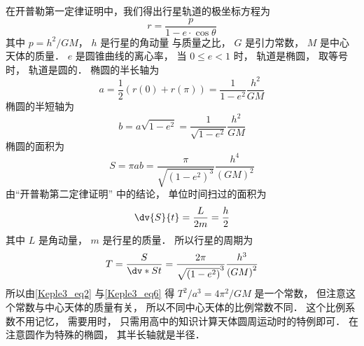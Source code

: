 

在开普勒第一定律证明中，我们得出行星轨道的极坐标方程为
\begin{equation}\label{Keple3_eq1}
  r = \frac{p}{{1 - e \cdot \cos \theta }}
\end{equation}
其中 $p = {{{h^2}}}/{{GM}}$，  $h$ 是行星的角动量%
与质量之比， $G$ 是引力常数， $M$ 是中心天体的质量． $e$ 是圆锥曲线的离心率， 当 $0 \le e < 1$ 时， 轨道是椭圆， 取等号时， 轨道是圆的． 椭圆的半长轴为
\begin{equation}\label{Keple3_eq2}
  a = \frac{1}{2}\left( {r\left( 0 \right) + r\left( \pi  \right)} \right) = \frac{1}{{1 - {e^2}}}\frac{{{h^2}}}{{GM}}
\end{equation}
椭圆的半短轴为
\begin{equation}\label{Keple3_eq3}
  b = a\sqrt {1 - {e^2}}  = \frac{1}{{\sqrt {1 - {e^2}} }}\frac{{{h^2}}}{{GM}}
\end{equation}
椭圆的面积为
\begin{equation}\label{Keple3_eq4}
  S = \pi ab = \frac{\pi }{\sqrt{\left(1 - e^2\right)^3} }\frac{h^4}{\left( GM \right)^2}
\end{equation}
由“开普勒第二定律证明” 中的结论， 单位时间扫过的面积为
\begin{equation}\label{Keple3_eq5}
\dv{S}{t} = \frac{L}{2m} = \frac{h}{2}
\end{equation}
其中 $L$ 是角动量， $m$ 是行星的质量． 所以行星的周期为
\begin{equation}\label{Keple3_eq6}
  T = \frac{S}{\dv*{S}{t}} = \frac{2\pi}{\sqrt{\left(1 - e^2 \right)}^3}\frac{h^3}{\left(GM\right)^2}
\end{equation}
所以由\autoref{Keple3_eq2} 与\autoref{Keple3_eq6} 得 $T^2/a^3 = 4\pi ^2/GM$ 是一个常数， 但注意这个常数与中心天体的质量有关， 所以不同中心天体的比例常数不同． 这个比例系数不用记忆， 需要用时， 只需用高中的知识计算天体圆周运动时的特例即可． 在注意圆作为特殊的椭圆， 其半长轴就是半径．
